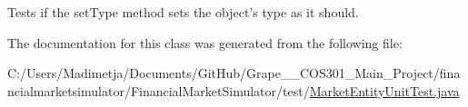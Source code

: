 Tests if the set\+Type method sets the object's type as it should. 



The documentation for this class was generated from the following file\+:\begin{DoxyCompactItemize}
\item 
C\+:/\+Users/\+Madimetja/\+Documents/\+Git\+Hub/\+Grape\+\_\+\+\_\+\+C\+O\+S301\+\_\+\+Main\+\_\+\+Project/financialmarketsimulator/\+Financial\+Market\+Simulator/test/\hyperlink{_market_entity_unit_test_8java}{Market\+Entity\+Unit\+Test.\+java}\end{DoxyCompactItemize}
